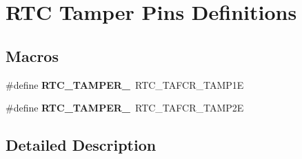 \hypertarget{group___r_t_c_ex___tamper___pins___definitions}{}\section{R\+TC Tamper Pins Definitions}
\label{group___r_t_c_ex___tamper___pins___definitions}
\subsection*{Macros}
\begin{DoxyCompactItemize}
\item 
\#define {\bfseries R\+T\+C\+\_\+\+T\+A\+M\+P\+E\+R\+\_}~R\+T\+C\+\_\+\+T\+A\+F\+C\+R\+\_\+\+T\+A\+M\+P1E\hypertarget{group___r_t_c_ex___tamper___pins___definitions_ga339f9515dea38efe31fbae679887c7b5}{}\label{group___r_t_c_ex___tamper___pins___definitions_ga339f9515dea38efe31fbae679887c7b5}

\item 
\#define {\bfseries R\+T\+C\+\_\+\+T\+A\+M\+P\+E\+R\+\_}~R\+T\+C\+\_\+\+T\+A\+F\+C\+R\+\_\+\+T\+A\+M\+P2E\hypertarget{group___r_t_c_ex___tamper___pins___definitions_gaca7aa22d4151651fe8c7d272ed1749f9}{}\label{group___r_t_c_ex___tamper___pins___definitions_gaca7aa22d4151651fe8c7d272ed1749f9}

\end{DoxyCompactItemize}


\subsection{Detailed Description}
